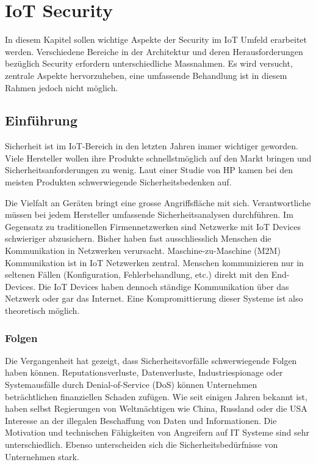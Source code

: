 \chapter{IoT Security}
In diesem Kapitel sollen wichtige Aspekte der Security im IoT Umfeld erarbeitet werden. Verschiedene Bereiche in der Architektur und deren Herausforderungen bezüglich Security erfordern unterschiedliche Massnahmen. Es wird versucht, zentrale Aspekte hervorzuheben, eine umfassende Behandlung ist in diesem Rahmen jedoch nicht möglich.
\section{Einführung}
Sicherheit ist im IoT-Bereich in den letzten Jahren immer wichtiger geworden. Viele Hersteller wollen ihre Produkte schnellstmöglich auf den Markt bringen und Sicherheitsanforderungen zu wenig. Laut einer Studie von HP kamen bei den meisten Produkten schwerwiegende Sicherheitsbedenken auf.\cite{SecOverview} 

Die Vielfalt an Geräten bringt eine grosse Angriffsfläche mit sich. Verantwortliche müssen bei jedem Hersteller umfassende Sicherheitsanalysen durchführen. Im Gegensatz zu traditionellen Firmennetzwerken sind Netzwerke mit IoT Devices schwieriger abzusichern. Bisher haben fast ausschliesslich Menschen die Kommunikation in Netzwerken verursacht. Maschine-zu-Maschine (M2M) Kommunikation ist in IoT Netzwerken zentral. Menschen kommunizieren nur in seltenen Fällen (Konfiguration, Fehlerbehandlung, etc.) direkt mit den End-Devices. Die IoT Devices haben dennoch ständige Kommunikation über das Netzwerk oder gar das Internet. Eine Kompromittierung dieser Systeme ist also theoretisch möglich.

\subsection{Folgen}
Die Vergangenheit hat gezeigt, dass Sicherheitsvorfälle schwerwiegende Folgen haben können. Reputationsverluste, Datenverluste, Industriespionage oder Systemausfälle durch Denial-of-Service (DoS) können Unternehmen beträchtlichen finanziellen Schaden zufügen. Wie seit einigen Jahren bekannt ist, haben selbst Regierungen von Weltmächtigen wie China, Russland oder die USA Interesse an der illegalen Beschaffung von Daten und Informationen. Die Motivation und technischen Fähigkeiten von Angreifern auf IT Systeme sind sehr unterschiedlich. Ebenso unterscheiden sich die Sicherheitsbedürfnisse von Unternehmen stark.

